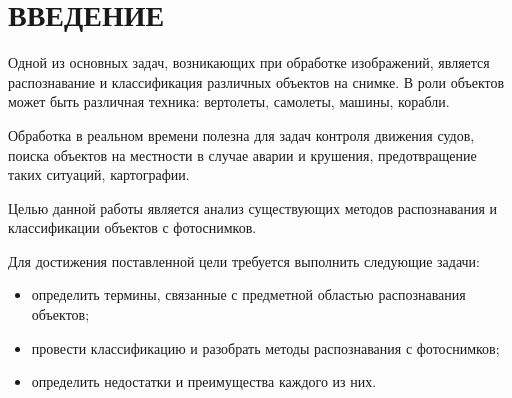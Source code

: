 \chapter*{ВВЕДЕНИЕ}


Одной из основных задач, возникающих при обработке изображений, является распознавание и классификация различных объектов на снимке. В роли объектов может быть различная техника: вертолеты, самолеты, машины, корабли.

Обработка в реальном времени полезна для задач контроля движения судов, поиска объектов на местности в случае аварии и крушения, предотвращение таких ситуаций, картографии.

Целью данной работы является анализ существующих методов распознавания и классификации объектов с фотоснимков.

Для достижения поставленной цели требуется выполнить следующие задачи:
\begin{itemize}
	\item определить термины, связанные с предметной областью распознавания объектов;
	\item провести классификацию и разобрать методы распознавания с фотоснимков;
	\item определить недостатки и преимущества каждого из них.
\end{itemize}